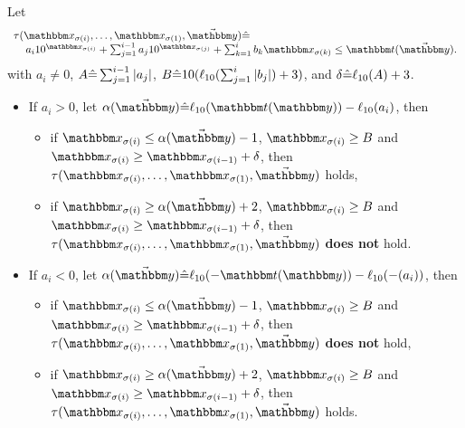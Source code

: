 \begin{lemma} \label{lem:exp-ineq}
Let  
%
$$
\begin{array}{l}
\tau(\ivarx_{\sigma(i)}, \ldots, \ivarx_{\sigma(1)}, \vec{\ivary}) \Def  \\
\hspace{4mm} 
a_i 10^{\ivarx_{\sigma(i)}}+\sum_{j=1}^{i-1} a_j 10^{\ivarx_{\sigma(j)}} + \sum_{k=1}^{i}b_k \ivarx_{\sigma(k)} \le \iterm(\vec{\ivary}).
\end{array}
$$
%
with $a_i \neq 0$, $A\hat{=} \sum_{j=1}^{i-1}|a_j|$, 
$B \hat{=} 10(\ell_{10}(\sum_{j=1}^{i}|b_j|)+3)$,
and $\delta\hat{=}  \ell_{10}(A)+3$. 
\begin{itemize}
    \item If $a_i > 0$, let $\alpha(\vec{\ivary}) \Def \ell_{10}(\iterm(\ivary))- \ell_{10}(a_i)$, then 
    \begin{itemize}
        \item if $\ivarx_{\sigma(i)} \le \alpha(\vec{\ivary})  -1$, $\ivarx_{\sigma(i)} \ge B$ and $\ivarx_{\sigma(i)} \ge \ivarx_{\sigma(i-1)} +\delta $, then $\tau(\ivarx_{\sigma(i)}, \ldots, \ivarx_{\sigma(1)}, \vec{\ivary})$ holds,
        \item if $\ivarx_{\sigma(i)} \ge \alpha(\vec{\ivary})  +2$, $\ivarx_{\sigma(i)} \ge B$ and $\ivarx_{\sigma(i)}  \ge \ivarx_{\sigma(i-1)} +\delta$, then $\tau(\ivarx_{\sigma(i)}, \ldots, \ivarx_{\sigma(1)}, \vec{\ivary})$ \textbf{does not} hold.
    \end{itemize}
    \item If $a_i < 0$, let $\alpha(\vec{\ivary})  \Def \ell_{10}(-\iterm(\ivary))- \ell_{10}(-(a_i))$, then 
    \begin{itemize}
        \item if $\ivarx_{\sigma(i)} \le \alpha(\vec{\ivary})  -1$, $\ivarx_{\sigma(i)} \ge B$ and $\ivarx_{\sigma(i)} \ge \ivarx_{\sigma(i-1)} +\delta $, then $\tau(\ivarx_{\sigma(i)}, \ldots, \ivarx_{\sigma(1)}, \vec{\ivary})$ \textbf{does not} hold,
        \item if $\ivarx_{\sigma(i)} \ge \alpha(\vec{\ivary})  +2$, $\ivarx_{\sigma(i)} \ge B$ and $\ivarx_{\sigma(i)} \ge \ivarx_{\sigma(i-1)} +\delta $, then $\tau(\ivarx_{\sigma(i)}, \ldots, \ivarx_{\sigma(1)}, \vec{\ivary})$ holds.
    \end{itemize}
\end{itemize}
\end{lemma}

